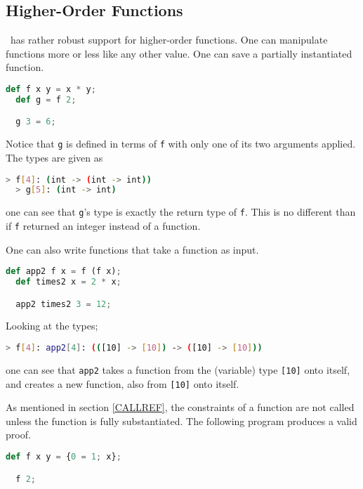 \subsection{Higher-Order Functions} \label{HOF}

\vampir\ has rather robust support for higher-order functions. One can manipulate functions more or less like any other value. One can save a partially instantiated function.

\begin{lstlisting}[language=Python]
  def f x y = x * y;
  def g = f 2;

  g 3 = 6;
\end{lstlisting}

Notice that \lstinline{g} is defined in terms of \lstinline{f} with only one of its two arguments applied. The types are given as

\begin{lstlisting}[language=bash]
  > f[4]: (int -> (int -> int))
  > g[5]: (int -> int)
\end{lstlisting}

one can see that \lstinline{g}'s type is exactly the return type of \lstinline{f}. This is no different than if \lstinline{f} returned an integer instead of a function.

One can also write functions that take a function as input.

\begin{lstlisting}[language=Python]
  def app2 f x = f (f x);
  def times2 x = 2 * x;

  app2 times2 3 = 12;
\end{lstlisting}

Looking at the types;

\begin{lstlisting}[language=bash]
  > f[4]: app2[4]: (([10] -> [10]) -> ([10] -> [10]))
\end{lstlisting}

one can see that \lstinline{app2} takes a function from the (variable) type \lstinline{[10]} onto itself, and creates a new function, also from \lstinline{[10]} onto itself.

As mentioned in section \ref{CALLREF}, the constraints of a function are not called unless the function is fully substantiated. The following program produces a valid proof.

\begin{lstlisting}[language=Python]
  def f x y = {0 = 1; x};

  f 2;
\end{lstlisting}

